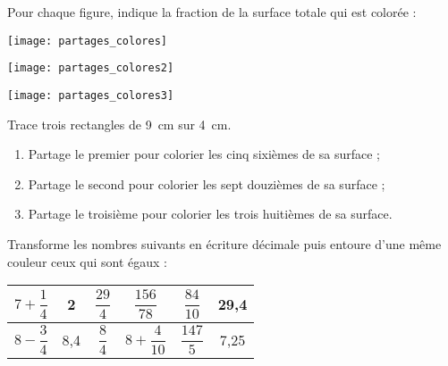 \begin{exercice}
Pour chaque figure, indique la fraction de la surface totale qui est colorée :
\begin{colenumerate}{3}
 \item 
 
 \texttt{[image: partages\_colores]}
 \item
  
 \texttt{[image: partages\_colores2]}
 \item
  
 \texttt{[image: partages\_colores3]}
 \end{colenumerate}
\end{exercice}


\begin{exercice}[Coloriage]
Trace trois rectangles de 9 cm sur 4 cm.
\begin{enumerate}
 \item Partage le premier pour colorier les cinq sixièmes de sa surface ;
 \item Partage le second pour colorier les sept douzièmes de sa surface ;
 \item Partage le troisième pour colorier les trois huitièmes de sa surface.
 \end{enumerate}
\end{exercice}


\begin{exercice}
Transforme les nombres suivants en écriture décimale puis entoure d’une même couleur ceux qui sont égaux :
\begin{center}
\renewcommand{\arraystretch}{2}
  \begin{tabular}{|c|c|c|c|c|c|} 
  \hline
  \rowcolor{F2} $7 + \dfrac{1}{4}$ & 2 & $\dfrac{29}{4}$ & $\dfrac{156}{78}$ & $\dfrac{84}{10}$ & 29,4 \\\hline
  \rowcolor{F2} $8 - \dfrac{3}{4}$ & 8,4 & $\dfrac{8}{4}$ & $8 + \dfrac{4}{10}$ & $\dfrac{147}{5}$ & 7,25 \\\hline
  \end{tabular}
  \renewcommand{\arraystretch}{1}
 \end{center}
\end{exercice}



